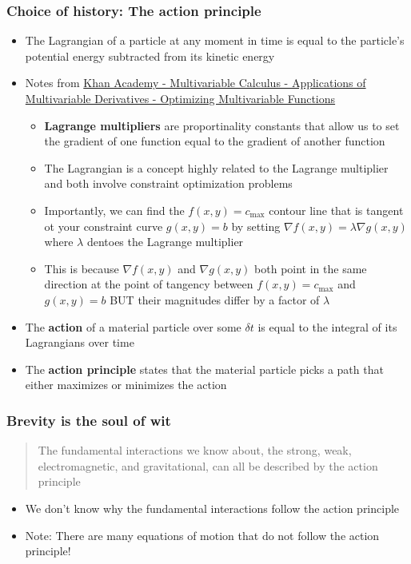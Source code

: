 \documentclass[a4paper]{article}
\begin{document}
        \subsubsection*{Choice of history: The action principle}
            \begin{itemize}
                \item The Lagrangian of a particle at any moment in time is equal to the particle's potential energy subtracted from its kinetic energy
                \item Notes from \href{https://www.khanacademy.org/math/multivariable-calculus/applications-of-multivariable-derivatives#optimizing-multivariable-functions-videos}{Khan Academy - Multivariable Calculus - Applications of Multivariable Derivatives - Optimizing Multivariable Functions}
                    \begin{itemize}
                        \item \textbf{Lagrange multipliers} are proportinality constants that allow us to set the gradient of one function equal to the gradient of another function
                        \item The Lagrangian is a concept highly related to the Lagrange multiplier and both involve constraint optimization problems
                        \item Importantly, we can find the $f(x,y)=c_{\mathrm{max}}$ contour line that is tangent ot your constraint curve $g(x,y)=b$ by setting $\nabla f(x,y) = \lambda \nabla g(x,y)$ where $\lambda$ dentoes the Lagrange multiplier
                        \item This is because $\nabla f(x,y)$ and $\nabla g(x,y)$ both point in the same direction at the point of tangency between $f(x,y)=c_{\mathrm{max}}$ and  $g(x,y)=b$ BUT their magnitudes differ by a factor of $\lambda$
                    \end{itemize}
                \item The \textbf{action} of a material particle over some $\delta t$ is equal to the integral of its Lagrangians over time
                \item The \textbf{action principle} states that the material particle picks a path that either maximizes or minimizes the action
            \end{itemize}
        \subsubsection*{Brevity is the soul of wit}
            \begin{quote}
                The fundamental interactions we know about, the strong, weak, electromagnetic, and gravitational, can all be described by the action principle
            \end{quote}
            \begin{itemize}
                \item We don't know why the fundamental interactions follow the action principle 
                \item Note: There are many equations of motion that do not follow the action principle!
            \end{itemize}
\end{document}
